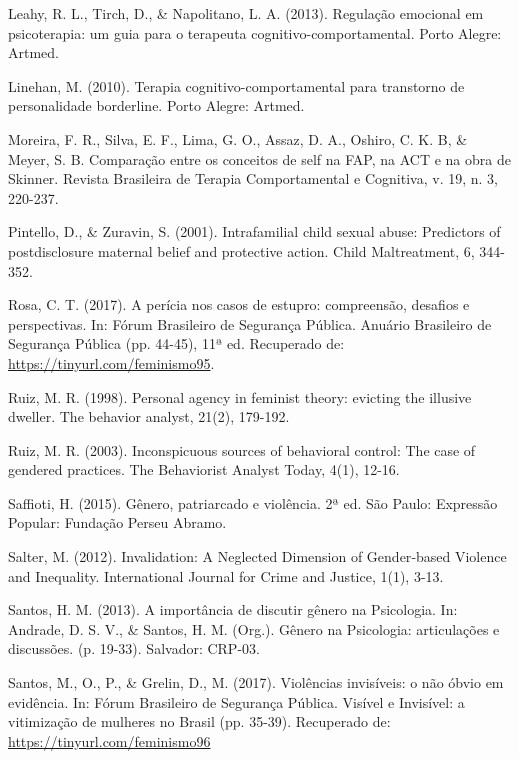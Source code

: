 \hangindent=25pt
\noindent Leahy, R. L., Tirch, D., \& Napolitano, L. A. (2013). Regulação emocional em psicoterapia: um guia para o terapeuta cognitivo-comportamental. Porto Alegre: Artmed.

\hangindent=25pt
\noindent Linehan, M. (2010). Terapia cognitivo-comportamental para transtorno de personalidade borderline. Porto Alegre: Artmed. 

\hangindent=25pt
\noindent Moreira, F. R., Silva, E. F., Lima, G. O., Assaz, D. A., Oshiro, C. K. B, \& Meyer, S. B. Comparação entre os conceitos de self na FAP, na ACT e na obra de Skinner. Revista Brasileira de Terapia Comportamental e Cognitiva, v. 19, n. 3, 220-237.

\hangindent=25pt
\noindent Pintello, D., \& Zuravin, S. (2001). Intrafamilial child sexual abuse: Predictors of postdisclosure maternal belief and protective action. Child Maltreatment, 6, 344-352.

\hangindent=25pt
\noindent Rosa, C. T. (2017). A perícia nos casos de estupro: compreensão, desafios e perspectivas. In: Fórum Brasileiro de Segurança Pública. Anuário Brasileiro de Segurança Pública (pp. 44-45), 11ª ed. Recuperado de: \url{https://tinyurl.com/feminismo95}.

\hangindent=25pt
\noindent Ruiz, M. R. (1998). Personal agency in feminist theory: evicting the illusive dweller. The behavior analyst, 21(2), 179-192.

\hangindent=25pt
\noindent Ruiz, M. R. (2003). Inconspicuous sources of behavioral control: The case of gendered practices. The Behaviorist Analyst Today, 4(1), 12-16. 

\hangindent=25pt
\noindent Saffioti, H. (2015). Gênero, patriarcado e violência. 2ª ed. São Paulo: Expressão Popular: Fundação Perseu Abramo.

\hangindent=25pt
\noindent Salter, M. (2012). Invalidation: A Neglected Dimension of Gender‐based Violence and Inequality. International Journal for Crime and Justice, 1(1), 3-13.

\hangindent=25pt
\noindent Santos, H. M. (2013). A importância de discutir gênero na Psicologia. In: Andrade, D. S. V., \& Santos, H. M. (Org.). Gênero na Psicologia: articulações e discussões. (p. 19-33). Salvador: CRP-03.

\hangindent=25pt
\noindent Santos, M., O., P., \& Grelin, D., M. (2017). Violências invisíveis: o não óbvio em evidência. In: Fórum Brasileiro de Segurança Pública. Visível e Invisível: a vitimização de mulheres no Brasil (pp. 35-39). Recuperado de: \url{https://tinyurl.com/feminismo96}

